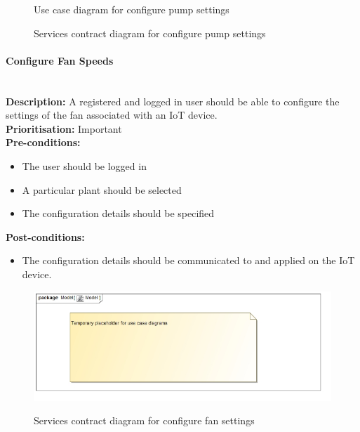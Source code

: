 \documentclass{article}
\begin{document}
		\begin{figure}[H]
			\caption{Use case diagram for configure pump settings}
		\end{figure}
		
		\begin{figure}[H]
			\caption{Services contract diagram for configure pump settings}
		\end{figure}
	
	\paragraph{Configure Fan Speeds}\mbox{}\\
		\textbf{Description:} A registered and logged in user should be able to configure the settings of the fan associated with an IoT device.\\
		\textbf{Prioritisation:} Important\\		
		\textbf{Pre-conditions:}
			\begin{itemize}
				\item The user should be logged in
				\item A particular plant should be selected
				\item The configuration details should be specified
			\end{itemize}
		\textbf{Post-conditions:}
			\begin{itemize}
				\item The configuration details should be communicated to and applied on the IoT device.
			\end{itemize}

		\begin{figure}[H]
			\includegraphics[width=\linewidth]{images/tempUseCase.jpg}
		\end{figure}
		
		\begin{figure}[H]
			\caption{Services contract diagram for configure fan settings}
		\end{figure}
	
\end{document}
